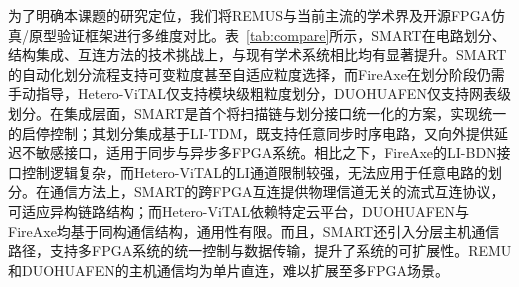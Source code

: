 为了明确本课题的研究定位，我们将REMUS与当前主流的学术界及开源FPGA仿真/原型验证框架进行多维度对比。表~\ref{tab:compare}所示，SMART在电路划分、结构集成、互连方法的技术挑战上，与现有学术系统相比均有显著提升。SMART的自动化划分流程支持可变粒度甚至自适应粒度选择，而FireAxe在划分阶段仍需手动指导，Hetero-ViTAL仅支持模块级粗粒度划分，DUOHUAFEN仅支持网表级划分。在集成层面，SMART是首个将扫描链与划分接口统一化的方案，实现统一的启停控制；其划分集成基于LI-TDM，既支持任意同步时序电路，又向外提供延迟不敏感接口，适用于同步与异步多FPGA系统。相比之下，FireAxe的LI-BDN接口控制逻辑复杂，而Hetero-ViTAL的LI通道限制较强，无法应用于任意电路的划分。在通信方法上，SMART的跨FPGA互连提供物理信道无关的流式互连协议，可适应异构链路结构；而Hetero-ViTAL依赖特定云平台，DUOHUAFEN与FireAxe均基于同构通信结构，通用性有限。而且，SMART还引入分层主机通信路径，支持多FPGA系统的统一控制与数据传输，提升了系统的可扩展性。REMU和DUOHUAFEN的主机通信均为单片直连，难以扩展至多FPGA场景。

\begin{table}[htbp]
    \centering
    \caption{SMART与现有相关技术的特性对比}
    \label{tab:compare}
    \renewcommand{\arraystretch}{1.2} %
\end{table}


